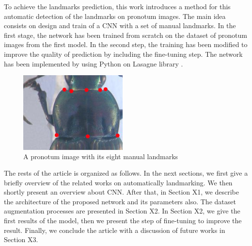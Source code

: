 \documentclass{article} %
\begin{document}
\begin{multicols}{2}
To achieve the landmarks prediction, this work introduces a method for this automatic detection of the landmarks on pronotum images. The main idea consists on design and train of a CNN \cite{lecun2010convolutional} with a set of manual landmarks. In the first stage, the network has been trained from scratch on the dataset of pronotum images from the first model. In the second step, the training has been modified to improve the quality of prediction by including the fine-tuning\cite{.} step. The network has been implemented by using Python on Lasagne library \cite{.}.

\begin{figure}[H]
	\centering
	\includegraphics[height=1.6in]{images/pronotum.jpg}
	\caption{A pronotum image with its eight manual landmarks}
	\label{figconvarc}
\end{figure}

The rests of the article is organized as follows. In the next sections, we first give a briefly overview of the related works on automatically landmarking. We then shortly present an overview about CNN. After that, in Section X1, we describe the architecture of the proposed network and its parameters also. The dataset augmentation processes are presented in Section X2. In Section X2, we give the first results of the model, then we present the step of fine-tuning to improve the result. Finally, we conclude the article with a discussion of future works in Section X3.


\end{multicols}
\end{document}
